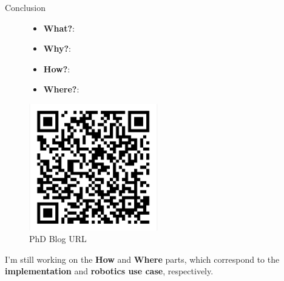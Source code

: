 \begin{frame}{Conclusion}
    \begin{figure}
        \begin{minipage}[t]{0.30\linewidth}
            \centering
            \vspace{0pt}
            \begin{itemize}
                \item \textbf{What?}: 
                \item \textbf{Why?}: 
                \item \textbf{How?}: 
                \item \textbf{Where?}: 
            \end{itemize}
        \end{minipage}
        \hspace{0.5cm}
        \begin{minipage}[t]{0.5\linewidth}
            \vspace{-1cm}
            \hspace{1.30cm}
            \captionsetup{justification=centering,margin=0cm}
            \includegraphics[width=0.5\textwidth]{img/blog.png}
            \caption{PhD Blog URL}    
        \end{minipage}
    \end{figure}

    \vspace{1cm}
    I'm still working on the \textbf{How} and \textbf{Where} parts, which correspond to the 
    \textbf{implementation} and \textbf{robotics use case}, respectively.
\end{frame}
